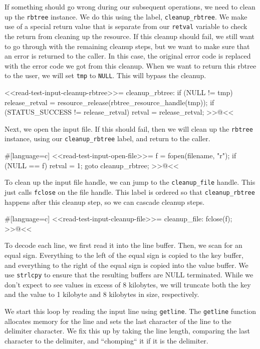 {If something should go wrong during our subsequent operations, we need to clean
up the \verb/rbtree/ instance. We do this using the label,
\verb/cleanup_rbtree/. We make use of a special return value that is separate
from our \verb/retval/ variable to check the return from cleaning up the
resource. If this cleanup should fail, we still want to go through with the
remaining cleanup steps, but we want to make sure that an error is returned to
the caller. In this case, the original error code is replaced with the error
code we got from this cleanup. When we want to return this rbtree to the user,
we will set \verb/tmp/ to \verb/NULL/.  This will bypass the cleanup.

<<read-test-input-cleanup-rbtree>>=
cleanup_rbtree:
    if (NULL != tmp)
    {
        release_retval = resource_release(rbtree_resource_handle(tmp));
        if (STATUS_SUCCESS != release_retval)
        {
            retval = release_retval;
        }
    }
>>@<<

Next, we open the input file. If this should fail, then we will clean up the
\verb/rbtree/ instance, using our \verb/cleanup_rbtree/ label, and return to the
caller.

#[language=c]
<<read-test-input-open-file>>=
    f = fopen(filename, "r");
    if (NULL == f)
    {
        retval = 1;
        goto cleanup_rbtree;
    }
>>@<<

To clean up the input file handle, we can jump to the \verb/cleanup_file/
handle. This just calls \verb/fclose/ on the file handle. This label is ordered
so that \verb/cleanup_rbtree/ happens after this cleanup step, so we can cascade
cleanup steps.

#[language=c]
<<read-test-input-cleanup-file>>=
cleanup_file:
    fclose(f);
>>@<<

To decode each line, we first read it into the line buffer. Then, we scan for an
equal sign. Everything to the left of the equal sign is copied to the key
buffer, and everything to the right of the equal sign is copied into the value
buffer. We use \verb/strlcpy/ to ensure that the resulting buffers are NULL
terminated. While we don't expect to see values in excess of 8 kilobytes, we
will truncate both the key and the value to 1 kilobyte and 8 kilobytes in size,
respectively.

We start this loop by reading the input line using \verb/getline/. The
\verb/getline/ function allocates memory for the line and sets the last
character of the line to the delimiter character. We fix this up by taking the
line length, comparing the last character to the delimiter, and ``chomping`` it
if it is the delimiter.

}
